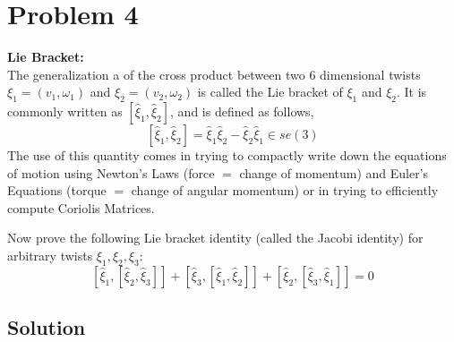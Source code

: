 \section*{Problem 4}
\setcounter{section}{4}
\setcounter{equation}{0}

\textbf{Lie Bracket:} \\
The generalization a of the cross product between two 6 dimensional twists \( \xi_{1}=\left(v_{1}, \omega_{1}\right) \) and \( \xi_{2}=\left(v_{2}, \omega_{2}\right) \) is called the Lie bracket of \( \xi_{1} \) and \( \xi_{2} \).
It is commonly written as \( \left[\widehat{\xi}_{1}, \widehat{\xi}_{2}\right] \), and is defined as follows,
\[
    \left[\widehat{\xi}_{1}, \widehat{\xi}_{2}\right]=\widehat{\xi}_{1} \widehat{\xi}_{2}-\widehat{\xi}_{2} \widehat{\xi}_{1} \in s e(3)
\]
The use of this quantity comes in trying to compactly write down the equations of motion using Newton's Laws (force \( = \) change of momentum) and Euler's Equations (torque \( = \) change of angular momentum) or in trying to efficiently compute Coriolis Matrices.

Now prove the following Lie bracket identity (called the Jacobi identity) for arbitrary twists \( \xi_{1}, \xi_{2}, \xi_{3} \):
\[
    \left[\widehat{\xi}_{1},\left[\widehat{\xi}_{2}, \widehat{\xi}_{3}\right]\right]+\left[\widehat{\xi}_{3},\left[\widehat{\xi}_{1}, \widehat{\xi}_{2}\right]\right]+\left[\widehat{\xi}_{2},\left[\widehat{\xi}_{3}, \widehat{\xi}_{1}\right]\right]=0
\]

\subsection*{Solution}
